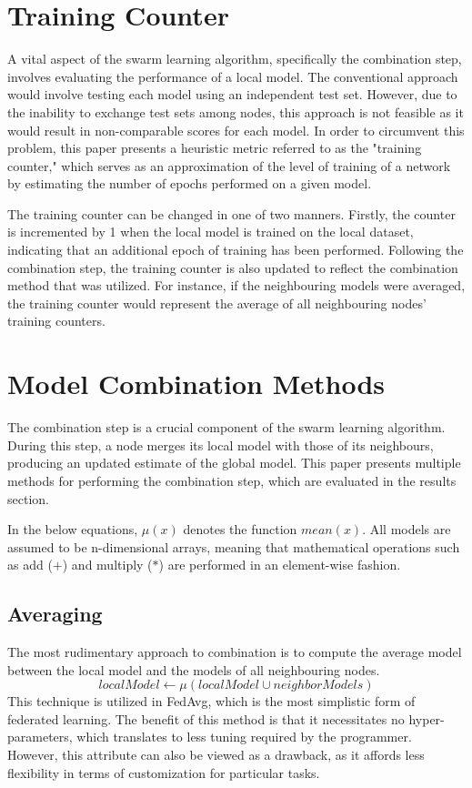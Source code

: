 \section{Training Counter}
A vital aspect of the swarm learning algorithm, specifically the combination step, involves evaluating the performance of a local model. The conventional approach would involve testing each model using an independent test set. However, due to the inability to exchange test sets among nodes, this approach is not feasible as it would result in non-comparable scores for each model. In order to circumvent this problem, this paper presents a heuristic metric referred to as the "training counter," which serves as an approximation of the level of training of a network by estimating the number of epochs performed on a given model.

The training counter can be changed in one of two manners. Firstly, the counter is incremented by 1 when the local model is trained on the local dataset, indicating that an additional epoch of training has been performed. Following the combination step, the training counter is also updated to reflect the combination method that was utilized. For instance, if the neighbouring models were averaged, the training counter would represent the average of all neighbouring nodes' training counters.

\section{Model Combination Methods}
The combination step is a crucial component of the swarm learning algorithm. During this step, a node merges its local model with those of its neighbours, producing an updated estimate of the global model. This paper presents multiple methods for performing the combination step, which are evaluated in the results section.

In the below equations, $\mu(x)$ denotes the function $mean(x)$. All models are assumed to be n-dimensional arrays, meaning that mathematical operations such as add ($+$) and multiply ($*$) are performed in an element-wise fashion.

\subsection{Averaging}
The most rudimentary approach to combination is to compute the average model between the local model and the models of all neighbouring nodes.
\[ localModel \gets \mu(localModel \cup neighborModels) \]
This technique is utilized in FedAvg, which is the most simplistic form of federated learning. The benefit of this method is that it necessitates no hyper-parameters, which translates to less tuning required by the programmer. However, this attribute can also be viewed as a drawback, as it affords less flexibility in terms of customization for particular tasks.

